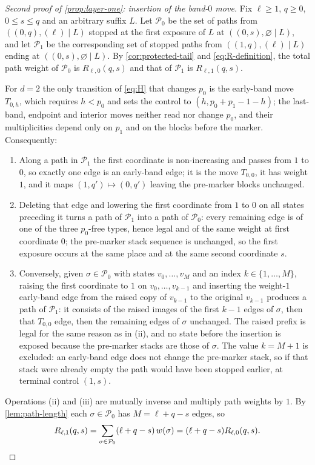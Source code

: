 \documentclass[11pt,reqno]{amsart}
\theoremstyle{definition}
\theoremstyle{remark}
\begin{document}
\begin{proof}[Second proof of \cref{prop:layer-one}: insertion of the
band-$0$ move]
Fix $\ell\geq1$, $q\geq0$, $0\leq s\leq q$ and an arbitrary suffix $L$.  Let
$\mathcal P_0$ be the set of paths from $((0,q),(\ell)\mid L)$ stopped at
the first exposure of $L$ at $((0,s),\varnothing\mid L)$, and let
$\mathcal P_1$ be the corresponding set of stopped paths from
$((1,q),(\ell)\mid L)$ ending at $((0,s),\varnothing\mid L)$.  By
\cref{cor:protected-tail} and \eqref{eq:R-definition}, the total path weight
of $\mathcal P_0$ is $R_{\ell,0}(q,s)$ and that of $\mathcal P_1$ is
$R_{\ell,1}(q,s)$.

For $d=2$ the only transition of \eqref{eq:H} that changes $p_0$ is the
early-band move $T_{0,h}$, which requires $h<p_0$ and sets the control to
$(h,p_0+p_1-1-h)$; the last-band, endpoint and interior moves neither read
nor change $p_0$, and their multiplicities depend only on $p_1$ and on the
blocks before the marker.  Consequently:

\begin{enumerate}
\item[(i)] Along a path in $\mathcal P_1$ the first coordinate is
non-increasing and passes from $1$ to $0$, so exactly one edge is an
early-band edge; it is the move $T_{0,0}$, it has weight $1$, and it maps
$(1,q')\mapsto(0,q')$ leaving the pre-marker blocks unchanged.
\item[(ii)] Deleting that edge and lowering the first coordinate from $1$ to
$0$ on all states preceding it turns a path of $\mathcal P_1$ into a path of
$\mathcal P_0$: every remaining edge is of one of the three $p_0$-free
types, hence legal and of the same weight at first coordinate $0$; the
pre-marker stack sequence is unchanged, so the first exposure occurs at the
same place and at the same second coordinate $s$.
\item[(iii)] Conversely, given $\sigma\in\mathcal P_0$ with states
$v_0,\ldots,v_M$ and an index $k\in\{1,\ldots,M\}$, raising the first
coordinate to $1$ on $v_0,\ldots,v_{k-1}$ and inserting the weight-$1$
early-band edge from the raised copy of $v_{k-1}$ to the original $v_{k-1}$
produces a path of $\mathcal P_1$: it consists of the raised images of the
first $k-1$ edges of $\sigma$, then that $T_{0,0}$ edge, then the remaining
edges of $\sigma$ unchanged.  The raised prefix is legal for the same reason
as in (ii), and no state before the insertion is exposed because the
pre-marker stacks are those of $\sigma$.  The value $k=M+1$ is excluded: an early-band
edge does not change the pre-marker stack, so if that stack were already
empty the path would have been stopped earlier, at terminal control
$(1,s)$.
\end{enumerate}
Operations (ii) and (iii) are mutually inverse and multiply path weights by
$1$.  By \cref{lem:path-length} each $\sigma\in\mathcal P_0$ has
$M=\ell+q-s$ edges, so
\[
 R_{\ell,1}(q,s)=\sum_{\sigma\in\mathcal P_0}(\ell+q-s)\,w(\sigma)
 =(\ell+q-s)R_{\ell,0}(q,s).\qedhere
\]
\end{proof}
\end{document}
